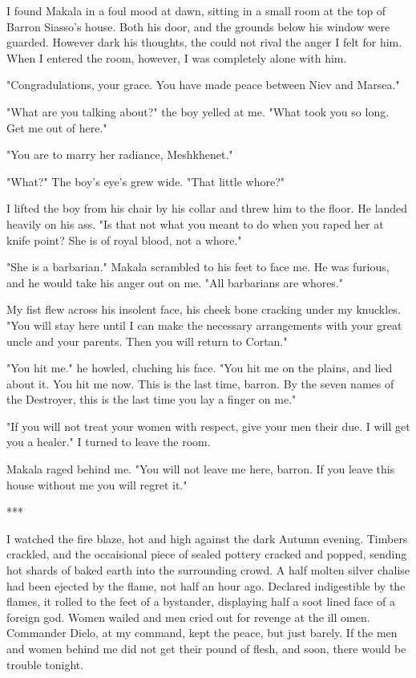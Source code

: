 \documentclass{article}
\begin{document}
\vspace{.5cm}

I found Makala in a foul mood at dawn, sitting in a small room at the top of Barron Siasso's house. Both his door, and the grounds below his window were guarded. However dark his thoughts, the could not rival the anger I felt for him. When I entered the room, however, I was completely alone with him.

"Congradulations, your grace. You have made peace between Niev and Marsea."

"What are you talking about?" the boy yelled at me. "What took you so long. Get me out of here."

"You are to marry her radiance, Meshkhenet."

"What?" The boy's eye's grew wide. "That little whore?"

I lifted the boy from his chair by his collar and threw him to the floor. He landed heavily on his ass. "Is that not what you meant to do when you raped her at knife point? She is of royal blood, not a whore."

"She is a barbarian." Makala scrambled to his feet to face me. He was furious, and he would take his anger out on me. "All barbarians are whores." 

My fist flew across his insolent face, his cheek bone cracking under my knuckles. "You will stay here until I can make the necessary arrangements with your great uncle and your parents. Then you will return to Cortan."

"You hit me." he howled, cluching his face. "You hit me on the plains, and lied about it. You hit me now. This is the last time, barron. By the seven names of the Destroyer, this is the last time you lay a finger on me."

"If you will not treat your women with respect, give your men their due. I will get you a healer." I turned to leave the room. 

Makala raged behind me. "You will not leave me here, barron. If you leave this house without me you will regret it."

\vspace{.5cm}
***

I watched the fire blaze, hot and high against the dark Autumn evening. Timbers crackled, and the occaisional piece of sealed pottery cracked and popped, sending hot shards of baked earth into the surrounding crowd. A half molten silver chalise had been ejected by the flame, not half an hour ago. Declared indigestible by the flames, it rolled to the feet of a bystander, displaying half a soot lined face of a foreign god. Women wailed and men cried out for revenge at the ill omen. Commander Dielo, at my command, kept the peace, but just barely. If the men and women behind me did not get their pound of flesh, and soon, there would be trouble tonight. 
\end{document}
